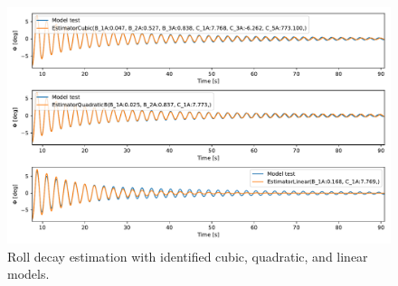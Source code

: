 \begin{figure}[h!]
    \centering
    \includegraphics[width=\linewidth]{kappa/images/roll_decay_model_compare.pdf}
    \caption{Roll decay estimation with identified cubic, quadratic, and linear models.}
    \label{fig:roll_decay_compare}
\end{figure}
\clearpage
